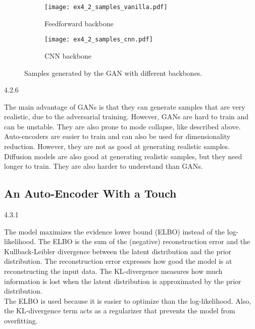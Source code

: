 \begin{figure}[ht]
  \centering
  \begin{subfigure}{0.4\textwidth}
    \texttt{[image: ex4\_2\_samples\_vanilla.pdf]}
    \caption{Feedforward backbone}
    \label{fig:ex4_2_samples_vanilla}
  \end{subfigure}
  \begin{subfigure}{0.4\textwidth}
    \texttt{[image: ex4\_2\_samples\_cnn.pdf]}
    \caption{CNN backbone}
    \label{fig:ex4_2_samples_cnn}
  \end{subfigure}
  \caption{Samples generated by the GAN with different backbones.}
  \label{fig:ex4_2_samples}
\end{figure}



\begin{task}{4.2.6}
\end{task}

The main advantage of GANs is that they can generate samples that are very realistic, due to the
adversarial training. However, GANs are hard to train and can be unstable. They are also prone to
mode collapse, like described above. Auto-encoders are easier to train and can also be used for
dimensionality reduction. However, they are not as good at generating realistic samples. Diffusion
models are also good at generating realistic samples, but they need longer to train. They are also
harder to understand than GANs.



\subsection{An Auto-Encoder With a Touch}
\label{ex:4.3}

\begin{task}{4.3.1}
\end{task}

The model maximizes the evidence lower bound (ELBO) instead of the log-likelihood. The ELBO is the
sum of the (negative) reconstruction error and the Kullback-Leibler divergence between the latent
distribution and the prior distribution. The reconstruction error expresses how good the model is at
reconstructing the input data. The KL-divergence measures how much information is lost when the
latent distribution is approximated by the prior distribution.\\
The ELBO is used because it is easier to optimize than the log-likelihood. Also, the KL-divergence
term acts as a regularizer that prevents the model from overfitting.



